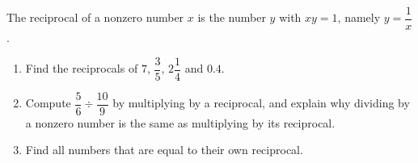 The reciprocal of a nonzero number $x$ is the number $y$ with $xy=1$, namely $y=\dfrac1x$.
\begin{enumerate}
\item[(a)] Find the reciprocals of $7$, $\dfrac35$, $2\dfrac14$ and $0.4$.
\item[(b)] Compute $\dfrac56\div\dfrac{10}9$ by multiplying by a reciprocal, and explain why dividing by a nonzero number is the same as multiplying by its reciprocal.
\item[(c)] Find all numbers that are equal to their own reciprocal.
\end{enumerate}
